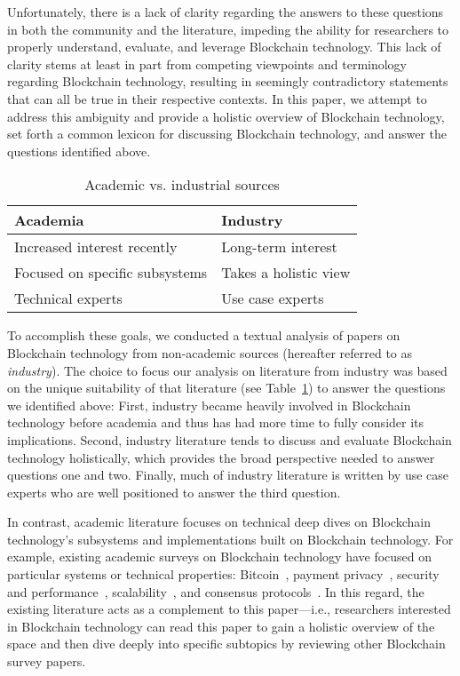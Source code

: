 Unfortunately, there is a lack of clarity regarding the answers to these questions in both the community and the literature, impeding the ability for researchers to properly understand, evaluate, and leverage Blockchain technology.
This lack of clarity stems at least in part from competing viewpoints and terminology regarding Blockchain technology, resulting in seemingly contradictory statements that can all be true in their respective contexts.
In this paper, we attempt to address this ambiguity and provide a holistic overview of Blockchain technology, set forth a common lexicon for discussing Blockchain technology, and answer the questions identified above.

\begin{table}
	\centering
	
	\begin{tabular}{l|l}
		\textbf{Academia} & \textbf{Industry} \\ \hline

		Increased interest recently & Long-term interest \\
		Focused on specific subsystems & Takes a holistic view \\
		Technical experts & Use case experts \\ \hline
	\end{tabular}
	
	\caption{Academic vs. industrial sources}
	\label{tab:sources}
\end{table}

To accomplish these goals, we conducted a textual analysis of papers on Blockchain technology from non-academic sources (hereafter referred to as \emph{industry}).
The choice to focus our analysis on literature from industry was based on the unique suitability of that literature (see Table~\ref{tab:sources}) to answer the questions we identified above:
First, industry became heavily involved in Blockchain technology before academia and thus has had more time to fully consider its implications.
Second, industry literature tends to discuss and evaluate Blockchain technology holistically, which provides the broad perspective needed to answer questions one and two.
Finally, much of industry literature is written by use case experts who are well positioned to answer the third question.

In contrast, academic literature focuses on technical deep dives on Blockchain technology's subsystems and implementations built on Blockchain technology.
For example, existing academic surveys on Blockchain technology have focused on particular systems or technical properties: Bitcoin~\cite{BMC+15,Narayanan17}, payment privacy~\cite{Conti17}, security and performance~\cite{Gervais16}, scalability~\cite{Croman16}, and consensus protocols~\cite{Bano17,garay2018consensus}.
In this regard, the existing literature acts as a complement to this 
paper---i.e., researchers interested in Blockchain technology can read this 
paper to gain a holistic overview of the space and then dive deeply into 
specific subtopics by reviewing other Blockchain survey papers.

